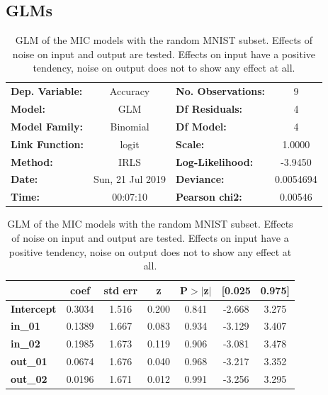 \documentclass{article}
\begin{document}
\subsection{GLMs}
\label{subsec:GLMs}

\begin{table}[!htb]
	\centering
	\caption{GLM of the MIC models with the random MNIST subset. Effects of noise on input and output are tested. Effects on input have a positive tendency, noise on output does not to show any effect at all.}
	\begin{tabular}{lclc}
		\toprule
		\textbf{Dep. Variable:} &     Accuracy     & \textbf{  No. Observations:  } &        9    \\
		\textbf{Model:}         &       GLM        & \textbf{  Df Residuals:      } &        4    \\
		\textbf{Model Family:}  &     Binomial     & \textbf{  Df Model:          } &        4    \\
		\textbf{Link Function:} &      logit       & \textbf{  Scale:             } &    1.0000   \\
		\textbf{Method:}        &       IRLS       & \textbf{  Log-Likelihood:    } &   -3.9450   \\
		\textbf{Date:}          & Sun, 21 Jul 2019 & \textbf{  Deviance:          } & 0.0054694   \\
		\textbf{Time:}          &     00:07:10     & \textbf{  Pearson chi2:      } &  0.00546    \\
		\bottomrule
	\end{tabular}
	\begin{tabular}{lcccccc}
		& \textbf{coef} & \textbf{std err} & \textbf{z} & \textbf{P$>$$|$z$|$} & \textbf{[0.025} & \textbf{0.975]}  \\
		\midrule
		\textbf{Intercept} &       0.3034  &        1.516     &     0.200  &         0.841        &       -2.668    &        3.275     \\
		\textbf{in\_01}    &       0.1389  &        1.667     &     0.083  &         0.934        &       -3.129    &        3.407     \\
		\textbf{in\_02}    &       0.1985  &        1.673     &     0.119  &         0.906        &       -3.081    &        3.478     \\
		\textbf{out\_01}   &       0.0674  &        1.676     &     0.040  &         0.968        &       -3.217    &        3.352     \\
		\textbf{out\_02}   &       0.0196  &        1.671     &     0.012  &         0.991        &       -3.256    &        3.295     \\
		\bottomrule
	\end{tabular}
	\label{table:MNIST_random_GLM}
\end{table}
\end{document}
